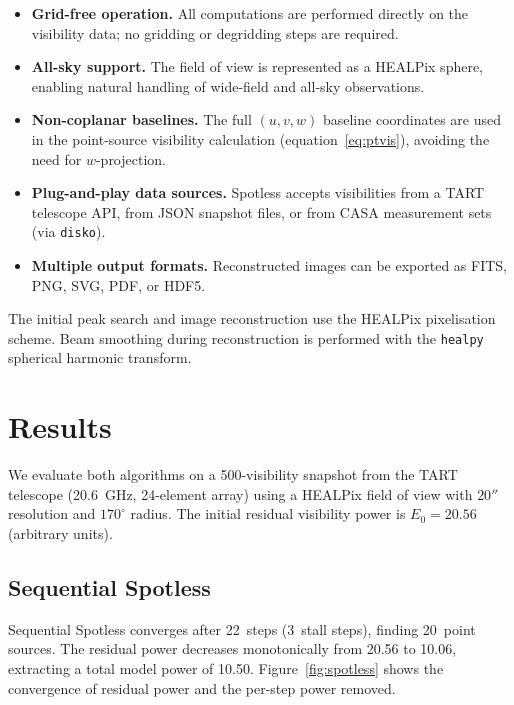 \documentclass[a4paper,11pt]{article}
\begin{document}
\begin{itemize}[leftmargin=*,nosep]
	\item \textbf{Grid-free operation.} All computations are performed
	      directly on the visibility data; no gridding or degridding steps
	      are required.
	\item \textbf{All-sky support.} The field of view is represented as a
	      HEALPix sphere, enabling natural handling of wide-field and
	      all-sky observations.
	\item \textbf{Non-coplanar baselines.} The full $(u, v, w)$ baseline
	      coordinates are used in the point-source visibility calculation
	      (equation~\ref{eq:ptvis}), avoiding the need for $w$-projection.
	\item \textbf{Plug-and-play data sources.} Spotless accepts
	      visibilities from a TART telescope API, from JSON snapshot
	      files, or from CASA measurement sets (via \texttt{disko}).
	\item \textbf{Multiple output formats.} Reconstructed images can be
	      exported as FITS, PNG, SVG, PDF, or HDF5.
\end{itemize}

The initial peak search and image reconstruction use the HEALPix
pixelisation scheme. Beam smoothing during reconstruction is performed
with the \texttt{healpy} spherical harmonic transform.

\section{Results}

We evaluate both algorithms on a 500-visibility snapshot from the TART
telescope (20.6~GHz, 24-element array) using a HEALPix field of view with
$20''$ resolution and $170^\circ$ radius.  The initial residual visibility
power is $E_0 = 20.56$ (arbitrary units).

\subsection{Sequential Spotless}

Sequential Spotless converges after 22~steps (3~stall steps), finding
20~point sources.  The residual power decreases monotonically from 20.56
to 10.06, extracting a total model power of 10.50.  Figure~\ref{fig:spotless}
shows the convergence of residual power and the per-step power removed.
\end{document}
